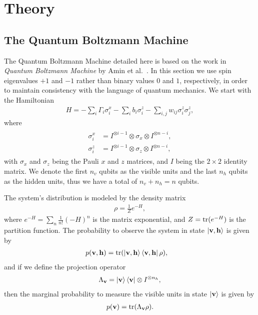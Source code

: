 \section{Theory}
\subsection{The Quantum Boltzmann Machine}
The Quantum Boltzmann Machine detailed here is based on the work in \textit{Quantum Boltzmann Machine} by Amin et al.~\cite{amin_2018}.
In this section we use spin eigenvalues \( +1 \) and \( -1 \) rather than binary values \( 0 \) and \( 1 \), respectively, in order to maintain consistency with the language of quantum mechanics.
We start with the Hamiltonian
\begin{align}
    H = -\sum_i \Gamma_i \sigma_i^x -\sum_i b_i \sigma_i^z - \sum_{i,j} w_{ij} \sigma_i^z \sigma_j^z,
\end{align}
where
\begin{align}
\begin{split}
    \sigma_i^x
        &= I^{\otimes i-1} \otimes \sigma_x \otimes I^{\otimes n-i}, \\
    \sigma_i^z
        &= I^{\otimes i-1} \otimes \sigma_z \otimes I^{\otimes n-i},
\end{split}
\end{align}
with \( \sigma_x \) and \( \sigma_z \) being the Pauli \( x \) and \( z \) matrices, and \( I \) being the \( 2 \times 2 \) identity matrix.
We denote the first \( n_v \) qubits as the visible units and the last \( n_h \) qubits as the hidden units, thus we have a total of \( n_v + n_h = n \) qubits.

The system's distribution is modeled by the density matrix
\begin{align}
    \rho = \frac{1}{Z} e^{-H},
\label{eq:density_operator}
\end{align}
where \( e^{-H} = \sum_n \frac{1}{n!} (-H)^n \) is the matrix exponential, and \( Z = \text{tr}(e^{-H}) \) is the partition function.
The probability to observe the system in state \( \ket{\mathbf{v},\mathbf{h}} \) is given by
\begin{align}
    p(\mathbf{v},\mathbf{h})
        &= \text{tr}(\ket{\mathbf{v},\mathbf{h}}\bra{\mathbf{v},\mathbf{h}} \rho),
\end{align}
and if we define the projection operator
\begin{align}
    \Lambda_{\mathbf{v}} = \ket{\mathbf{v}}\bra{\mathbf{v}} \otimes I^{\otimes n_h},
\end{align}
then the marginal probability to measure the visible units in state \( \ket{\mathbf{v}} \) is given by
\begin{align}
    p(\mathbf{v}) = \text{tr}(\Lambda_{\mathbf{v}}\rho).
\end{align}

